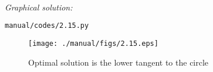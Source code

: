 \documentclass[journal,12pt,twocolumn]{IEEEtran}
\renewcommand\thesection{\arabic{section}}
\begin{document}
\begin{enumerate}[label=\thesection.\arabic*,ref=\thesection.\theenumi]
\solution 
%
\\
{\em Graphical solution:} 
%
%	
\begin{lstlisting}
manual/codes/2.15.py
\end{lstlisting}

%
%
\begin{figure}[!ht]
\centering
\texttt{[image: ./manual/figs/2.15.eps]}
\caption{ Optimal solution is the lower tangent to the circle}
\label{fig.2.15}	
\end{figure}
%
\end{enumerate}
\iffalse
\end{document}
